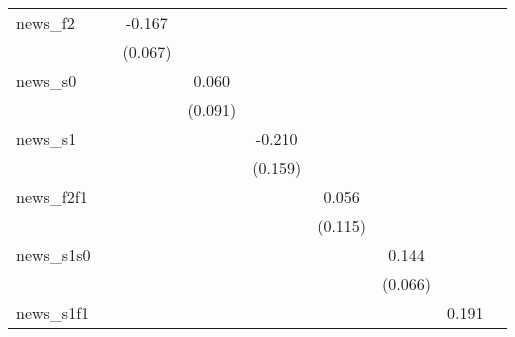 {\begin{tabular}{l*{8}{c}}
news\_f2     &                     &      -0.167\sym{**} &                     &                     &                     &                     &                     &                     \\
            &                     &     (0.067)         &                     &                     &                     &                     &                     &                     \\
\addlinespace
news\_s0     &                     &                     &       0.060         &                     &                     &                     &                     &                     \\
            &                     &                     &     (0.091)         &                     &                     &                     &                     &                     \\
\addlinespace
news\_s1     &                     &                     &                     &      -0.210         &                     &                     &                     &                     \\
            &                     &                     &                     &     (0.159)         &                     &                     &                     &                     \\
\addlinespace
news\_f2f1   &                     &                     &                     &                     &       0.056         &                     &                     &                     \\
            &                     &                     &                     &                     &     (0.115)         &                     &                     &                     \\
\addlinespace
news\_s1s0   &                     &                     &                     &                     &                     &       0.144\sym{**} &                     &                     \\
            &                     &                     &                     &                     &                     &     (0.066)         &                     &                     \\
\addlinespace
news\_s1f1   &                     &                     &                     &                     &                     &                     &       0.191         &                     \\

\end{tabular}}
